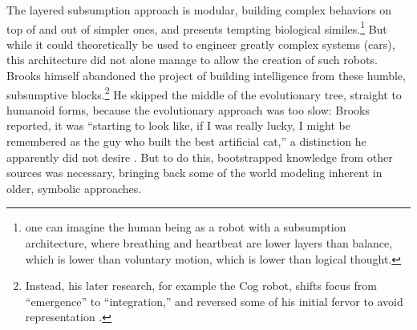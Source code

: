 



The layered subsumption approach is modular, building complex
behaviors on top of and out of simpler ones, and presents tempting
biological similes.\footnote{one can imagine the human being as a
robot with a subsumption 
architecture, where breathing and heartbeat are lower layers than balance,
which is lower than voluntary motion, which is lower than logical
thought.} But while it could theoretically be used to engineer greatly
complex systems (cars), this architecture did not alone manage to allow the
creation of such robots.
Brooks himself abandoned the project of building intelligence from
these humble, subsumptive blocks.\footnote{Instead, his later research, for example
the Cog robot, shifts focus from ``emergence'' to ``integration,'' and
reversed some of his initial fervor to avoid representation \cite[p.
  258]{ekbia}.} He skipped the middle of the evolutionary tree, straight
to humanoid forms, because the evolutionary approach was too slow: 
Brooks reported, it was ``starting to look like, if I was really
lucky, I might be remembered as the guy who built the best artificial
cat,'' a distinction he apparently did not desire \cite[p.
  65]{brooksflesh}. But to do this, bootstrapped knowledge from other sources was
necessary, bringing back some of the world modeling inherent in older,
symbolic approaches. 

